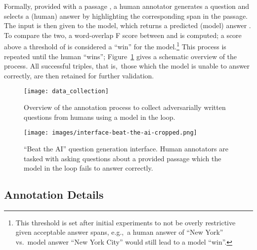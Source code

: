 \documentclass[11pt,a4paper]{article}
\begin{document}
Formally, provided with a passage , a human annotator generates a question  and selects a (human) answer  by highlighting the corresponding span in the passage. 
The input  is then given to the model, which returns a predicted (model) answer . 
To compare the two, a word-overlap F score between  and  is computed; 
a score above a threshold of  is considered a ``win'' for the model.\footnote{
This threshold is set after initial experiments to not be overly restrictive given acceptable answer spans, e.g.,~a human answer of ``New York'' vs.~model answer ``New York City'' would still lead to a model ``win''.
}
This process is repeated until the human ``wins'';
Figure~\ref{fig:data_collection} gives a schematic overview of the process. 
All successful  triples, that is,~those which the model is unable to answer correctly, are then retained for further validation.


\begin{figure}[t]
    \centering
    \texttt{[image: data\_collection]}
    \caption{Overview of the annotation process to collect adversarially written questions from humans using a model in the loop.
    } 
    \label{fig:data_collection}
\end{figure}


\begin{figure*}[!ht]
    \centering
    \texttt{[image: images/interface-beat-the-ai-cropped.png]}
    \caption{``Beat the AI'' question generation interface. Human annotators are tasked with asking questions about a provided passage which the model in the loop fails to answer correctly.} 
    \label{fig:interface_question_generation}
\end{figure*}


\subsection{Annotation Details}
\end{document}
